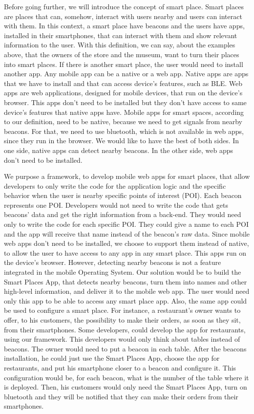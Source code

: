Before going further, we will introduce the concept of
smart place. Smart places are places that can, somehow,
interact with users nearby and users can interact 
with them.
In this context, a smart place have beacons and the users
have apps, installed in their smartphones, that can interact
with them and show relevant information to the user.
With this definition, we can say, about the examples above,
that the owners of the store and the museum, want to
turn their places into smart places.
If there is another smart place, the user would need to
install another app.
Any mobile app can be a native or a web app. Native apps
are apps that we have to install and that can access
device's features, such as BLE. Web apps are web
applications, designed for mobile devices, that run
on the device's browser. This apps don't need to be
installed but they don't have access
to same device's features that native apps have.
Mobile apps for smart spaces, according to our definition,
need to be native, because we need to get signals from
nearby beacons. For that, we need to use bluetooth, which is
not available in web apps, since they run in the browser.
We would like to have the best of both sides. In one side,
native apps can detect nearby beacons. In the other side,
web apps don't need to be installed.

We purpose a framework, to develop mobile web apps for smart
places, that allow developers to only write the code
for the application logic and the specific behavior when
the user is nearby specific points of interest (POI).
Each beacon represents one POI. Developers would not need
to write the code that gets beacons' data and get the
right information from a back-end. They would need only
to write the code for each specific POI. They could give
a name to each POI and the app will receive that name 
instead of the beacon's raw data. Since mobile web
apps don't need to be installed, we choose to support
them instead of native, to allow
the user to have access to any app in any smart place.
This apps run on the device's browser. However, detecting
nearby beacons is not a feature integrated in the mobile
Operating System. Our solution would be to build the
Smart Places App,
that detects nearby beacons, turn them into names and
other high-level information, and deliver it to the
mobile web app. The user would need only this app to
be able to access any smart place app. Also, the same app
could be used to configure a smart place.
For instance, a restaurant's owner wants to offer, to
his customers, the possibility to make their orders,
as soon as they sit, from their smartphones. Some
developers, could develop the app for restaurants,
using our framework. This developers would only think
about tables instead of beacons. The owner would need
to put a beacon in each table. After the beacons
installation, he could just use the Smart Places App,
choose the app for restaurants, and put his smartphone
closer to a beacon and configure it. This configuration
would be, for each beacon, what is the number of the table
where it is deployed. Then, his customers would only
need the Smart Places App, turn on bluetooth and they will
be notified that they can make their orders from their
smartphones.

